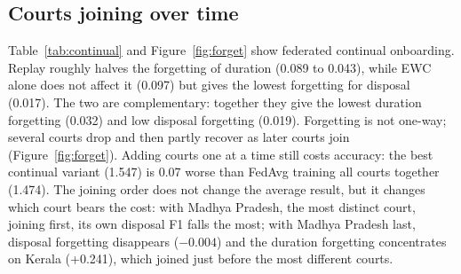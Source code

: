 \subsection{Courts joining over time}
Table~\ref{tab:continual} and Figure~\ref{fig:forget} show federated continual onboarding. Replay roughly halves the forgetting of duration (0.089 to 0.043), while EWC alone does not affect it (0.097) but gives the lowest forgetting for disposal (0.017). The two are complementary: together they give the lowest duration forgetting (0.032) and low disposal forgetting (0.019). Forgetting is not one-way; several courts drop and then partly recover as later courts join (Figure~\ref{fig:forget}). Adding courts one at a time still costs accuracy: the best continual variant (1.547) is 0.07 worse than FedAvg training all courts together (1.474). The joining order does not change the average result, but it changes which court bears the cost: with Madhya Pradesh, the most distinct court, joining first, its own disposal F1 falls the most; with Madhya Pradesh last, disposal forgetting disappears ($-0.004$) and the duration forgetting concentrates on Kerala (+0.241), which joined just before the most different courts.

